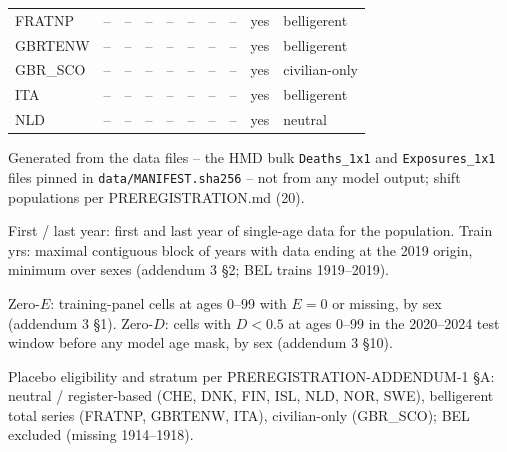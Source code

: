 \begin{threeparttable}
\begin{tabular}{@{}lrrrrrrrll@{}}
FRATNP & -- & -- & -- & -- & -- & -- & -- & yes & belligerent \\
GBRTENW & -- & -- & -- & -- & -- & -- & -- & yes & belligerent \\
GBR\_SCO & -- & -- & -- & -- & -- & -- & -- & yes & civilian-only \\
ITA & -- & -- & -- & -- & -- & -- & -- & yes & belligerent \\
NLD & -- & -- & -- & -- & -- & -- & -- & yes & neutral \\
\bottomrule
\end{tabular}
\begin{tablenotes}\scriptsize
\item Generated from the data files -- the HMD bulk \texttt{Deaths\_1x1} and \texttt{Exposures\_1x1} files pinned in \texttt{data/MANIFEST.sha256} -- not from any model output; shift populations per PREREGISTRATION.md (20).
\item First / last year: first and last year of single-age data for the population. Train yrs: maximal contiguous block of years with data ending at the 2019 origin, minimum over sexes (addendum 3 \S2; BEL trains 1919--2019).
\item Zero-$E$: training-panel cells at ages 0--99 with $E=0$ or missing, by sex (addendum 3 \S1). Zero-$D$: cells with $D<0.5$ at ages 0--99 in the 2020--2024 test window before any model age mask, by sex (addendum 3 \S10).
\item Placebo eligibility and stratum per PREREGISTRATION-ADDENDUM-1 \S A: neutral / register-based (CHE, DNK, FIN, ISL, NLD, NOR, SWE), belligerent total series (FRATNP, GBRTENW, ITA), civilian-only (GBR\_SCO); BEL excluded (missing 1914--1918).
\end{tablenotes}
\end{threeparttable}
